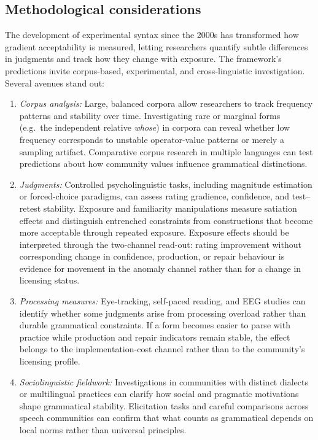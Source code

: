 \documentclass[12pt,letterpaper]{article}
\newcommand{\mention}[1]{\textit{#1}}
\begin{document}
\subsection{Methodological considerations}\label{sec:Methodological-Considerations}

The development of experimental syntax since the 2000s \autocite{schutze2016} has transformed how gradient acceptability is measured, letting researchers quantify subtle differences in judgments and track how they change with exposure. The framework's predictions invite corpus-based, experimental, and cross-linguistic investigation. Several avenues stand out:

\begin{enumerate}
\item \emph{Corpus analysis:} Large, balanced corpora allow researchers to track frequency patterns and stability over time. Investigating rare or marginal forms (e.g.\ the independent relative \mention{whose}) in corpora can reveal whether low frequency corresponds to unstable operator-value patterns or merely a sampling artifact. Comparative corpus research in multiple languages can test predictions about how community values influence grammatical distinctions.

\item \emph{Judgments:} Controlled psycholinguistic tasks, including
magnitude estimation or forced-choice paradigms, can assess rating gradience,
confidence, and test--retest stability. Exposure and familiarity manipulations
measure satiation effects and distinguish entrenched constraints from
constructions that become more acceptable through repeated exposure. Exposure
effects should be interpreted through the two-channel read-out: rating
improvement without corresponding change in confidence, production, or repair
behaviour is evidence for movement in the anomaly channel rather than for a
change in licensing status.

\item \emph{Processing measures:} Eye-tracking, self-paced reading, and EEG
studies can identify whether some judgments arise from processing overload
rather than durable grammatical constraints. If a form becomes easier to parse
with practice while production and repair indicators remain stable, the effect
belongs to the implementation-cost channel rather than to the community's
licensing profile.

\item \emph{Sociolinguistic fieldwork:} Investigations in communities with distinct dialects or multilingual practices can clarify how social and pragmatic motivations shape grammatical stability. Elicitation tasks and careful comparisons across speech communities can confirm that what counts as grammatical depends on local norms rather than universal principles.


\end{enumerate}
\end{document}
